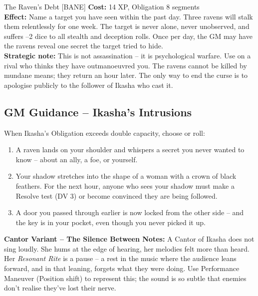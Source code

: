 \documentclass[10pt,a5paper]{book}
\begin{document}
\begin{patronbox}{The Raven’s Debt [BANE]}
\textbf{Cost:} 14 XP, Obligation 8 segments \\
\textbf{Effect:} Name a target you have seen within the past day. Three ravens will stalk them relentlessly for one week. The target is never alone, never unobserved, and suffers –2 dice to all stealth and deception rolls. Once per day, the GM may have the ravens reveal one secret the target tried to hide. \\
\textbf{Strategic note:} This is not assassination – it is psychological warfare. Use on a rival who thinks they have outmanoeuvred you. The ravens cannot be killed by mundane means; they return an hour later. The only way to end the curse is to apologise publicly to the follower of Ikasha who cast it.
\end{patronbox}

\subsection*{GM Guidance – Ikasha’s Intrusions}

When Ikasha’s Obligation exceeds double capacity, choose or roll:
\begin{enumerate}
    \item A raven lands on your shoulder and whispers a secret you never wanted to know – about an ally, a foe, or yourself.
    \item Your shadow stretches into the shape of a woman with a crown of black feathers. For the next hour, anyone who sees your shadow must make a Resolve test (DV 3) or become convinced they are being followed.
    \item A door you passed through earlier is now locked from the other side – and the key is in your pocket, even though you never picked it up.
\end{enumerate}

\noindent \textbf{Cantor Variant – The Silence Between Notes:}
A Cantor of Ikasha does not sing loudly. She hums at the edge of hearing, her melodies felt more than heard. Her \textit{Resonant Rite} is a pause – a rest in the music where the audience leans forward, and in that leaning, forgets what they were doing. Use Performance Maneuver (Position shift) to represent this; the sound is so subtle that enemies don’t realise they’ve lost their nerve.

\end{document}
